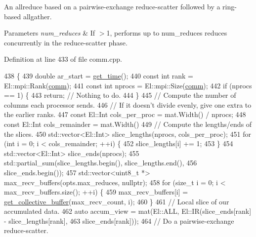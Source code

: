 An allreduce based on a pairwise-\/exchange reduce-\/scatter followed by a ring-\/based allgather. 
\begin{DoxyParams}{Parameters}
{\em num\+\_\+reduces} & If $>$1, performs up to num\+\_\+reduces reduces concurrently in the reduce-\/scatter phase. \\
\hline
\end{DoxyParams}


Definition at line 433 of file comm.\+cpp.


\begin{DoxyCode}
438                                           \{
439   \textcolor{keywordtype}{double} ar\_start = \hyperlink{namespacelbann_a478d36031ff0659893c4322cd856157f}{get\_time}();
440   \textcolor{keyword}{const} \textcolor{keywordtype}{int} rank = El::mpi::Rank(\hyperlink{file__io_8cpp_ab048c6f9fcbcfaa57ce68b00263dbebe}{comm});
441   \textcolor{keyword}{const} \textcolor{keywordtype}{int} nprocs = El::mpi::Size(\hyperlink{file__io_8cpp_ab048c6f9fcbcfaa57ce68b00263dbebe}{comm});
442   \textcolor{keywordflow}{if} (nprocs == 1) \{
443     \textcolor{keywordflow}{return};  \textcolor{comment}{// Nothing to do.}
444   \}
445   \textcolor{comment}{// Compute the number of columns each processor sends.}
446   \textcolor{comment}{// If it doesn't divide evenly, give one extra to the earlier ranks.}
447   \textcolor{keyword}{const} El::Int cols\_per\_proc = mat.Width() / nprocs;
448   \textcolor{keyword}{const} El::Int cols\_remainder = mat.Width() %
449   \textcolor{comment}{// Compute the lengths/ends of the slices.}
450   std::vector<El::Int> slice\_lengths(nprocs, cols\_per\_proc);
451   \textcolor{keywordflow}{for} (\textcolor{keywordtype}{int} i = 0; i < cols\_remainder; ++i) \{
452     slice\_lengths[i] += 1;
453   \}
454   std::vector<El::Int> slice\_ends(nprocs);
455   std::partial\_sum(slice\_lengths.begin(), slice\_lengths.end(),
456                    slice\_ends.begin());
457   std::vector<uint8\_t *> max\_recv\_buffers(opts.max\_reduces, \textcolor{keyword}{nullptr});
458   \textcolor{keywordflow}{for} (\textcolor{keywordtype}{size\_t} i = 0; i < max\_recv\_buffers.size(); ++i) \{
459     max\_recv\_buffers[i] = \hyperlink{classlbann_1_1lbann__comm_ae925ac5eaf2895717c709b252961b3bf}{get\_collective\_buffer}(max\_recv\_count, i);
460   \}
461   \textcolor{comment}{// Local slice of our accumulated data.}
462   \textcolor{keyword}{auto} accum\_view = mat(El::ALL, El::IR(slice\_ends[rank] - slice\_lengths[rank],
463                                     slice\_ends[rank]));
464   \textcolor{comment}{// Do a pairwise-exchange reduce-scatter.}

\end{DoxyCode}
